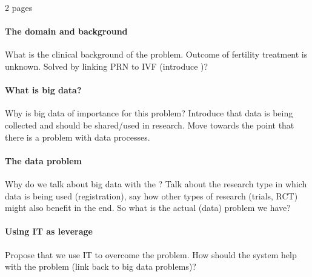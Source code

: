 2 pages

\paragraph{The domain and background}
What is the clinical background of the problem. 
Outcome of fertility treatment is unknown.
Solved by linking PRN to IVF (introduce \project{})?
\paragraph{What is big data?}
Why is big data of importance for this problem?
Introduce that data is being collected and should be shared/used in research.
Move towards the point that there is a problem with data processes.
\paragraph{The data problem}
Why do we talk about big data with the \project{}?
Talk about the research type in which data is being used (registration), say how other types of research (trials, RCT) might also benefit in the end.
So what is the actual (data) problem we have?
\paragraph{Using IT as leverage}
Propose that we use IT to overcome the problem.
How should the system help with the problem (link back to big data problems)?
